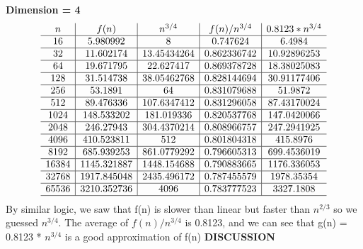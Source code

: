\documentclass[11pt]{article}
\begin{document}
\textbf{Dimension = 4}
$$
\begin{array}{c|c|c|c|c}
n & f(n) & n^{3/4} & f(n)/n^{3/4}  & 0.8123 * n^{3/4} \\ \hline 
16 & 5.980992 & 8 & 0.747624  & 6.4984\\ \hline
32 & 11.602174 &  13.45434264 & 0.862336742 & 10.92896253 \\ \hline
64 & 19.671795  & 22.627417 & 0.869378728 & 18.38025083\\ \hline
128 & 31.514738 & 38.05462768 & 0.828144694 & 30.91177406\\ \hline
256 & 53.1891 & 64 & 0.831079688 & 51.9872\\ \hline
512 & 89.476336  & 107.6347412  & 0.831296058 & 87.43170024\\ \hline
1024 & 148.533202 & 181.019336 & 0.820537768 & 147.0420066 \\ \hline
2048 & 246.27943  & 304.4370214 & 0.808966757 & 247.2941925 \\ \hline
4096 & 410.523811 & 512 & 0.801804318 & 415.8976 \\ \hline
8192 & 685.939253 & 861.0779292 & 0.796605313 & 699.4536019 \\ \hline
16384 & 1145.321887 & 1448.154688 & 0.790883665 & 1176.336053\\ \hline
32768 & 1917.845048 & 2435.496172 & 0.787455579 & 1978.35354 \\ \hline
65536 & 3210.352736 & 4096 & 0.783777523 & 3327.1808 \\ \hline
\end{array}
$$
By similar logic, we saw that f(n) is slower than linear but faster than $n^{2/3}$ so we guessed $n^{3/4}$. The average of $f(n)/n^{3/4}$ is 0.8123, and we can see that g(n) = 0.8123 * $n^{3/4}$ is a good approximation of f(n)
\newpage
\textbf{DISCUSSION}
\end{document}
